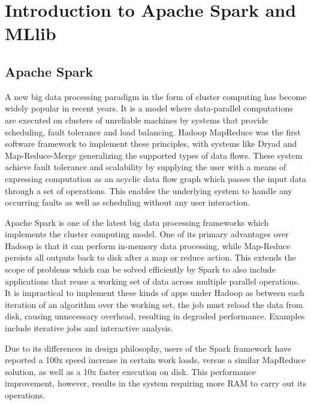\documentclass{l4proj}
\begin{document}

\chapter{Introduction to Apache Spark and MLlib}
\label{spark}
\section{Apache Spark}

A new big data processing paradigm in the form of cluster computing has become widely popular in recent years. It is a model where data-parallel computations are executed on clusters of unreliable machines by systems that provide scheduling, fault tolerance and load balancing\cite{Spark}. Hadoop MapReduce was the first software framework to implement these principles\cite{MapReduce}, with systems like Dryad\cite{Dryad} and Map-Reduce-Merge\cite{MRM} generalizing the supported types of data flows. These system achieve fault tolerance and scalability by supplying the user with a means of expressing computation as an acyclic data flow graph which passes the input data through a set of operations. This enables the underlying system to handle any occurring faults as well as scheduling without any user interaction.

Apache Spark is one of the latest big data processing frameworks which implements the cluster computing model. One of its primary advantages over Hadoop is that it can perform in-memory data processing, while Map-Reduce persists all outputs back to disk after a map or reduce action. This extends the scope of problems which can be solved efficiently by Spark to also include applications that reuse a working set of data across multiple parallel operations. It is impractical to implement these kinds of apps under Hadoop as between each iteration of an algorithm over the working set, the job must reload the data from disk, causing unnecessary overhead, resulting in degraded performance. Examples include iterative jobs and interactive analysis\cite{Spark}.

Due to its differences in design philosophy, users of the Spark framework have reported a 100x speed increase in certain work loads, versus a similar MapReduce solution, as well as a 10x faster execution on disk\cite{webSpark}. This performance improvement, however, results in the system requiring more RAM to carry out its operations.
\end{document}
